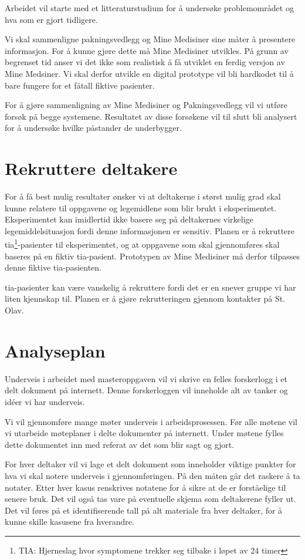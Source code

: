Arbeidet vil starte med et litteraturstudium for å undersøke problemområdet og hva som er gjort tidligere. 

Vi skal sammenligne pakningsvedlegg og Mine Medisiner sine måter å presentere informasjon. For å kunne gjøre dette må Mine Medisiner utvikles. På grunn av begrenset tid anser vi det ikke som realistisk å få utviklet en ferdig versjon av Mine Medsiner. Vi skal derfor utvikle en digital prototype vil bli hardkodet til å bare fungere for et fåtall fiktive pasienter. 

For å gjøre sammenligning av Mine Medisiner og Pakningsvedlegg vil vi utføre forsøk på begge systemene. Resultatet av disse forsøkene vil til slutt bli analysert for å undersøke hvilke påstander de underbygger.

\section{Rekruttere deltakere}
For å få best mulig resultater ønsker vi at deltakerne i størst mulig grad skal kunne relatere til oppgavene og legemidlene som blir brukt i eksperimentet. Eksperimentet kan imidlertid ikke basere seg på deltakernes virkelige legemiddelsituasjon fordi denne informasjonen er sensitiv. Planen er å rekruttere \acrshort{tia}\footnote{TIA: Hjerneslag hvor symptomene trekker seg tilbake i løpet av 24 timer}-pasienter til eksperimentet, og at oppgavene som skal gjennomføres skal baseres på en fiktiv \acrshort{tia}-pasient. Prototypen av Mine Medisiner må derfor tilpasses denne fiktive \acrshort{tia}-pasienten. 

\acrshort{tia}-pasienter kan være vanskelig å rekruttere fordi det er en snever gruppe vi har liten kjennskap til. Planen er å gjøre rekrutteringen gjennom kontakter på St. Olav.


\section{Analyseplan}
Underveis i arbeidet med masteroppgaven vil vi skrive en felles forskerlogg i et delt dokument på internett. Denne forskerloggen vil inneholde alt av tanker og idéer vi har underveis. 

Vi vil gjennomføre mange møter underveis i arbeidsprosessen. Før alle møtene vil vi utarbeide møteplaner i delte dokumenter på internett. Under møtene fylles dette dokumentet inn med referat av det som blir sagt og gjort.

For hver deltaker vil vi lage et delt dokument som inneholder viktige punkter for hva vi skal notere underveis i gjennomføringen. På den måten går det raskere å ta notater. Etter hver kasus renskrives notatene for å sikre at de er forståelige til senere bruk. Det vil også tas vare på eventuelle skjema som deltakerene fyller ut. Det vil føres på et identifiserende tall på alt materiale fra hver deltaker, for å kunne skille kasusene fra hverandre. 

